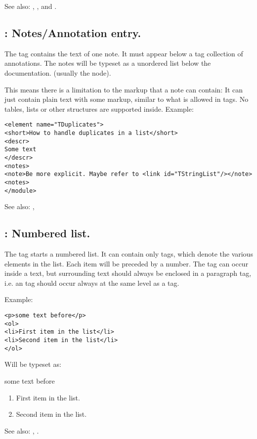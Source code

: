 See also: , ,  and .

\subsection{ : Notes/Annotation entry.}
\label{tag:note}
The  tag contains the text of one note. It must appear below a tag  
collection of annotations. The notes will be typeset as a unordered list below the documentation. 
(usually the  node).

This means there is a limitation to the markup that a note can contain:
It can just contain plain text with some markup, similar to what is allowed in  tags.
No tables, lists or other structures are supported inside.
Example:
\begin{verbatim}
<element name="TDuplicates">
<short>How to handle duplicates in a list</short>
<descr>
Some text
</descr>
<notes>
<note>Be more explicit. Maybe refer to <link id="TStringList"/></note>
<notes>
</module>
\end{verbatim}

See also: , 

\subsection{ : Numbered list.}
\label{tag:ol}
The  tag starts a numbered list. It can contain only 
tags, which denote the various elements in the list. Each item will be
preceded by a number. The  tag can
occur inside a text, but surrounding text should always be enclosed in a
 paragraph tag, i.e. an  tag should occur always at the
same level as a  tag.

Example:
\begin{verbatim}
<p>some text before</p>
<ol>
<li>First item in the list</li>
<li>Second item in the list</li>
</ol>
\end{verbatim}
Will be typeset as:

some text before
\begin{enumerate}
\item First item in the list.
\item Second item in the list.
\end{enumerate}

See also: , .


